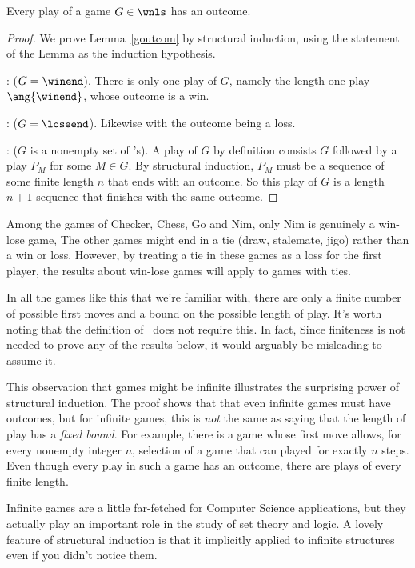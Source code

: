 \begin{definition}
\begin{lemma}\label{goutcom}
Every play of a game $G \in \wnls$ has an outcome.
\end{lemma}

\begin{proof}
We prove Lemma~\ref{goutcom} by structural induction, using the
statement of the Lemma as the induction hypothesis.

: ($G = \winend$).  There is only one play of
$G$, namely the length one play $\ang{\winend}$, whose outcome is a
win.

: ($G= \loseend$).  Likewise with the outcome
being a loss.

: ($G$ is a nonempty set of \wnls's).
A play of $G$ by definition consists $G$ followed by a play $P_M$ for
some $M \in G$.  By structural induction, $P_M$ must be a sequence of
some finite length $n$ that ends with an outcome.  So this play of $G$
is a length $n+1$ sequence that finishes with the same outcome.
\end{proof}

Among the games of Checker, Chess, Go and Nim, only Nim is genuinely a
win-lose game,   The other games might end in a tie (draw, stalemate,
jigo) rather than a win or loss.  However, by treating a tie in these
games as a loss for the first player, the results about win-lose games
will apply to games with ties.

In all the games like this that we're familiar with, there are only a
finite number of possible first moves and a bound on the possible
length of play.  It's worth noting that the definition of \wnls\ does
not require this.  In fact, Since finiteness is not needed to prove
any of the results below, it would arguably be misleading to assume
it.

This observation that games might be infinite illustrates the
surprising power of structural induction.  The proof shows that that
even infinite games must have outcomes, but for infinite games, this
is \emph{not} the same as saying that the length of play has a
\emph{fixed bound}.  For example, there is a game whose first move allows,
for every nonempty integer $n$, selection of a game that can played
for exactly $n$ steps.  Even though every play in such a game has an
outcome, there are plays of every finite length.

Infinite games are a little far-fetched for Computer Science
applications, but they actually play an important role in the study of
set theory and logic.  A lovely feature of structural induction is
that it implicitly applied to infinite structures even if you didn't
notice them.


\end{definition}
